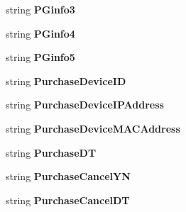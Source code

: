 \begin{DoxyCompactItemize}
\item 
string {\bfseries P\+Ginfo3}\hypertarget{a00141_aeb91968d9606b25258fd1f2f62e7a30d}{}\label{a00141_aeb91968d9606b25258fd1f2f62e7a30d}

\item 
string {\bfseries P\+Ginfo4}\hypertarget{a00141_a7c816884a5c6038d60b49cc4e2dcfc16}{}\label{a00141_a7c816884a5c6038d60b49cc4e2dcfc16}

\item 
string {\bfseries P\+Ginfo5}\hypertarget{a00141_aae18bfb0d6e7ff35e034044f5fcb50f0}{}\label{a00141_aae18bfb0d6e7ff35e034044f5fcb50f0}

\item 
string {\bfseries Purchase\+Device\+ID}\hypertarget{a00141_a31ab27e7ef3ab6cadec1298b22dbc7d0}{}\label{a00141_a31ab27e7ef3ab6cadec1298b22dbc7d0}

\item 
string {\bfseries Purchase\+Device\+I\+P\+Address}\hypertarget{a00141_ad2e76f618fee94c6eedc3cc7653bce2f}{}\label{a00141_ad2e76f618fee94c6eedc3cc7653bce2f}

\item 
string {\bfseries Purchase\+Device\+M\+A\+C\+Address}\hypertarget{a00141_afa81a983b56400243bda831390bfcdd6}{}\label{a00141_afa81a983b56400243bda831390bfcdd6}

\item 
string {\bfseries Purchase\+DT}\hypertarget{a00141_ad7a4c71a0d2f536fb00d263aa3058dcb}{}\label{a00141_ad7a4c71a0d2f536fb00d263aa3058dcb}

\item 
string {\bfseries Purchase\+Cancel\+YN}\hypertarget{a00141_ae2295baec3a555e7020f49e88ed507f9}{}\label{a00141_ae2295baec3a555e7020f49e88ed507f9}

\item 
string {\bfseries Purchase\+Cancel\+DT}\hypertarget{a00141_ae9b734c85cd648bef5483e7caa5829b7}{}\label{a00141_ae9b734c85cd648bef5483e7caa5829b7}


\end{DoxyCompactItemize}

